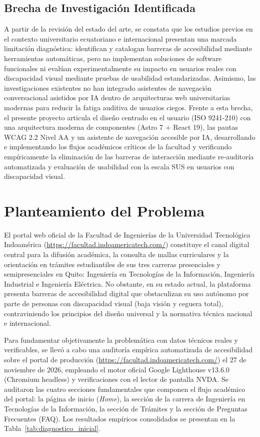 \subsection{Brecha de Investigación Identificada}
A partir de la revisión del estado del arte, se constata que los estudios previos en el contexto universitario ecuatoriano e internacional presentan una marcada limitación diagnóstica: identifican y catalogan barreras de accesibilidad mediante herramientas automáticas, pero no implementan soluciones de software funcionales ni evalúan experimentalmente su impacto en usuarios reales con discapacidad visual mediante pruebas de usabilidad estandarizadas. Asimismo, las investigaciones existentes no han integrado asistentes de navegación conversacional asistidos por IA dentro de arquitecturas web universitarias modernas para reducir la fatiga auditiva de usuarios ciegos. Frente a esta brecha, el presente proyecto articula el diseño centrado en el usuario (ISO 9241-210) con una arquitectura moderna de componentes (Astro 7 + React 19), las pautas WCAG 2.2 Nivel AA y un asistente de navegación accesible por IA, desarrollando e implementando los flujos académicos críticos de la facultad y verificando empíricamente la eliminación de las barreras de interacción mediante re-auditoría automatizada y evaluación de usabilidad con la escala SUS en usuarios con discapacidad visual.

\section{Planteamiento del Problema}
El portal web oficial de la Facultad de Ingenierías de la Universidad Tecnológica Indoamérica (\url{https://facultad.indoamericatech.com/}) constituye el canal digital central para la difusión académica, la consulta de mallas curriculares y la orientación en trámites estudiantiles de sus tres carreras presenciales y semipresenciales en Quito: Ingeniería en Tecnologías de la Información, Ingeniería Industrial e Ingeniería Eléctrica. No obstante, en su estado actual, la plataforma presenta barreras de accesibilidad digital que obstaculizan su uso autónomo por parte de personas con discapacidad visual (baja visión y ceguera total), contraviniendo los principios del diseño universal y la normativa técnica nacional e internacional.

Para fundamentar objetivamente la problemática con datos técnicos reales y verificables, se llevó a cabo una auditoría empírica automatizada de accesibilidad sobre el portal de producción (\url{https://facultad.indoamericatech.com/}) el 27 de noviembre de 2026, empleando el motor oficial Google Lighthouse v13.6.0 (Chromium headless) y verificaciones con el lector de pantalla NVDA. Se auditaron las cuatro secciones fundamentales que componen el flujo académico del portal: la página de inicio (\textit{Home}), la sección de la carrera de Ingeniería en Tecnologías de la Información, la sección de Trámites y la sección de Preguntas Frecuentes (FAQ). Los resultados empíricos consolidados se presentan en la Tabla~\ref{tab:diagnostico_inicial}.

